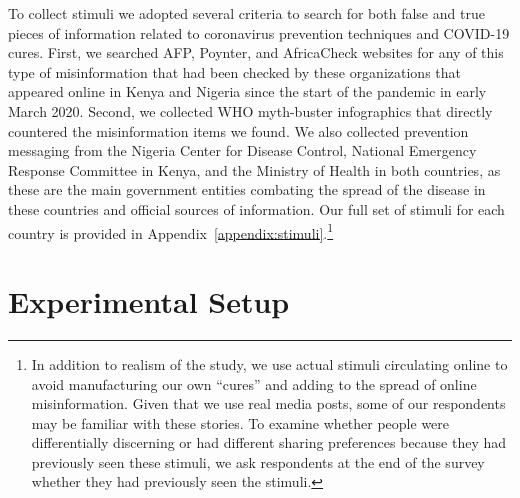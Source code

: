 \documentclass[letterpaper, 12pt, parskip=full,DIV=10]{scrartcl}
\begin{document}
To collect stimuli we adopted several criteria to search for both false and true pieces of information related to coronavirus prevention techniques and COVID-19 cures. First, we searched AFP, Poynter, and AfricaCheck websites for any of this type of misinformation that had been checked by these organizations that appeared online in Kenya and Nigeria since the start of the pandemic in early March 2020. Second, we collected WHO myth-buster infographics that directly countered the misinformation items we found. We also collected prevention messaging from the Nigeria Center for Disease Control, National Emergency Response Committee in Kenya, and the Ministry of Health in both countries, as these are the main government entities combating the spread of the disease in these countries and official sources of information. Our full set of stimuli for each country is provided in Appendix~\ref{appendix:stimuli}.\footnote{In addition to realism of the study, we use actual stimuli circulating online to avoid manufacturing our own ``cures'' and adding to the spread of online misinformation. Given that we use real media posts, some of our respondents may be familiar with these stories. To examine whether people were differentially discerning \citep{nyhan2020facts} or had different sharing preferences because they had previously seen these stimuli, we ask respondents at the end of the survey whether they had previously seen the stimuli.}








\FloatBarrier
\section{Experimental Setup}
\end{document}
